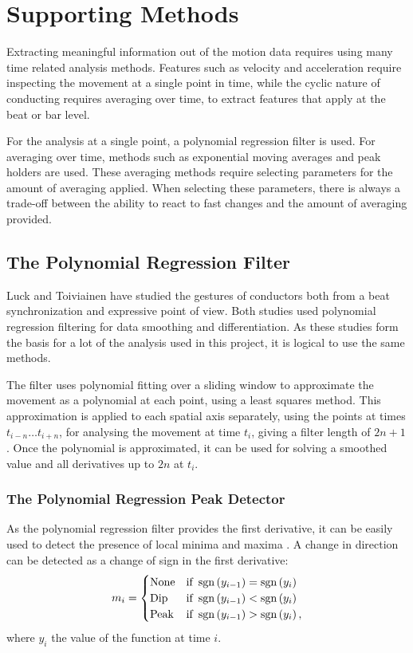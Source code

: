 \section{Supporting Methods}

Extracting meaningful information out of the motion data
requires using many time related analysis methods.
Features such as velocity and acceleration
require inspecting the movement at a single point in time,
while the cyclic nature of conducting requires
averaging over time, to extract features that apply
at the beat or bar level.

For the analysis at a single point,
a polynomial regression filter is used.
For averaging over time, methods such as
exponential moving averages and peak holders are used.
These averaging methods require selecting 
parameters for the amount of averaging applied.
When selecting these parameters,
there is always a trade-off between the 
ability to react to fast changes
and the amount of averaging provided.

\subsection{The Polynomial Regression Filter}

Luck and Toiviainen have studied the gestures of conductors
both from a beat synchronization \cite{luck2006}
and expressive \cite{luck2010} point of view.
Both studies used polynomial regression filtering
for data smoothing and differentiation.
As these studies form the basis for a lot
of the analysis used in this project,
it is logical to use the same methods.

The filter uses polynomial fitting
over a sliding window to approximate the movement
as a polynomial at each point,
using a least squares method.
This approximation is applied to each spatial axis separately,
using the points at times $t_{i-n} \ldots t_{i+n}$,
for analysing the movement at time $t_i$,
giving a filter length of $2n + 1$.
Once the polynomial is approximated,
it can be used for solving a smoothed value and
all derivatives up to $2n$ at $t_i$.

\subsubsection*{The Polynomial Regression Peak Detector}

As the polynomial regression filter provides the first derivative,
it can be easily used to detect the presence of local minima and maxima
.
A change in direction can be detected as a change of sign in the first derivative:
\begin{equation}
m_i =
\begin{cases}
\mathrm{None} & \text{if } \operatorname{sgn} \left( y_{i-1} \right) = \operatorname{sgn} \left( y_{i} \right) \\
\mathrm{Dip} & \text{if } \operatorname{sgn} \left( y_{i-1} \right) < \operatorname{sgn} \left( y_{i} \right) \\
\mathrm{Peak} & \text{if } \operatorname{sgn} \left( y_{i-1} \right) > \operatorname{sgn} \left( y_{i} \right) ,
\end{cases}
\end{equation}
where $y_i$ the value of the function at time $i$.

